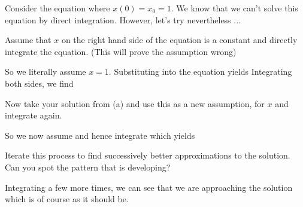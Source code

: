 
Consider the equation
where $x(0)=x_0=1$. We know that we can't solve this equation by direct integration. However, let's try nevertheless ...

\subquestion
Assume that $x$ on the right hand side of the equation is a constant and directly integrate the equation. (This will prove the assumption wrong)

\solution
So we literally assume $x=1$. Substituting into the equation yields 
Integrating both sides, we find 

\subquestion Now take your solution from (a) and use this as a new assumption, for $x$ and integrate again.

\solution 
So we now assume 
and hence integrate
which yields

\subquestion Iterate this process to find successively better approximations to the solution. Can you spot the pattern that is developing?

\solution
Integrating a few more times, we can see that we are approaching the solution 
which is of course as it should be.
